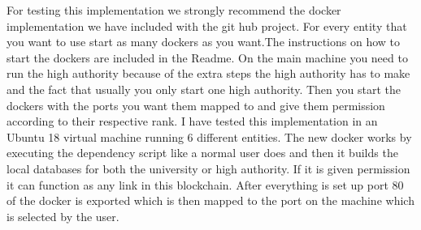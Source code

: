 \documentclass[conference]{IEEEtran}
\begin{document}
For testing this implementation we strongly recommend the docker implementation we have included with the git hub project. For every entity that you want to use start as many dockers as you want.The instructions on how to start the dockers are included in the Readme. On the main machine you need to run the high authority because of the extra steps the high authority has to make and the fact that usually you only start one high authority. Then you start the dockers with the ports you want them mapped to and give them permission according to their respective rank. I have tested this implementation in an Ubuntu 18 virtual machine running 6 different entities. The new docker works by executing the dependency script like a normal user does and then it builds the local databases for both the university or high authority. If it is given permission it can function as any link in this blockchain. After everything is set up port 80 of the docker is exported which is then mapped to the port on the machine which is selected by the user.
\end{document}
